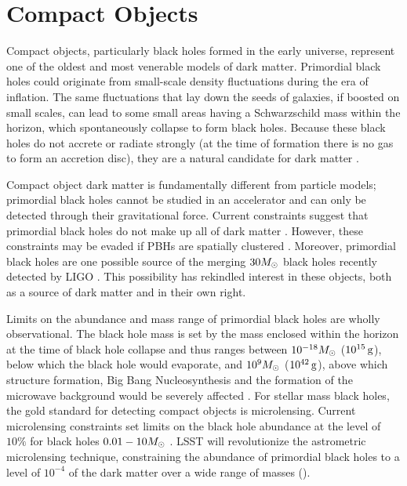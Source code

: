 \section{Compact Objects }
\label{sec:machos}

Compact objects, particularly black holes formed in the early universe, represent one of the oldest and most venerable models of dark matter. Primordial black holes could originate from small-scale density fluctuations during the era of inflation. The same fluctuations that lay down the seeds of galaxies, if boosted on small scales, can lead to some small areas having a Schwarzschild mass within the horizon, which spontaneously collapse to form black holes. Because these black holes do not accrete or radiate strongly (at the time of formation there is no gas to form an accretion disc), they are a natural candidate for dark matter \citep{Carr:1974nx,Meszaros:1974,1975Natur.253..251C,Bellido:1996,Carr:2016drx}. 

Compact object dark matter is fundamentally different from particle models; primordial black holes cannot be studied in an accelerator and can only be detected through their gravitational force. Current constraints suggest that primordial black holes do not make up all of dark matter \citep[\eg][]{Sasaki:2018}. However, these constraints may be evaded if PBHs are spatially clustered \citep{Clesse:2015,Clesse:2017}. Moreover, primordial black holes are one possible source of the merging $30 M_\odot$ black holes recently detected by LIGO \citep{Bird:2016,Clesse:2016}. This possibility has rekindled interest in these objects, both as a source of dark matter and in their own right.

Limits on the abundance and mass range of primordial black holes are wholly observational. The black hole mass is set by the mass enclosed within the horizon at the time of black hole collapse and thus ranges between $10^{-18} M_\odot$ ($10^{15}\mathrm{\,g}$), below which the black hole would evaporate, and $10^9 M_\odot$ ($10^{42}\mathrm{\,g}$), above which structure formation, Big Bang Nucleosynthesis and the formation of the microwave background would be severely affected \citep{Sasaki:2018}. 
For stellar mass black holes, the gold standard for detecting compact objects is microlensing. Current microlensing constraints set limits on the black hole abundance at the level of $10\%$ for black holes $0.01 - 10 M_\odot$ \citep[however, see][]{Calcino:2018}. LSST will revolutionize the astrometric microlensing technique,  constraining the abundance of primordial black holes to a level of $10^{-4}$ of the dark matter over a wide range of masses ().

